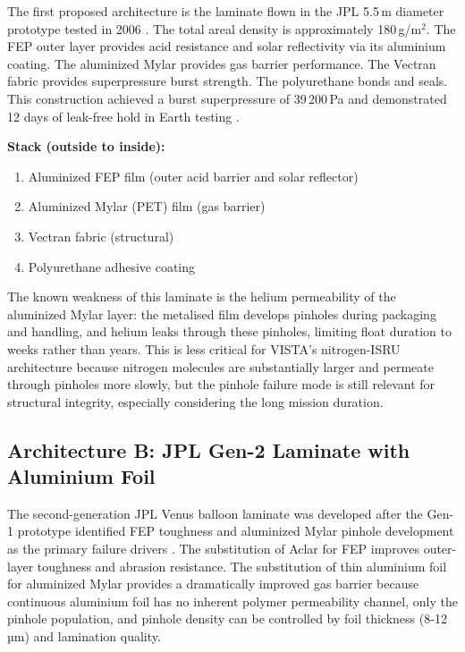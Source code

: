 \noindent The first proposed architecture is the laminate flown in the JPL 5.5\,m diameter prototype tested in 2006 \cite{Hall2007_VenusPrototype}. The total areal density is approximately 180\,g/m$^2$. The FEP outer layer provides acid resistance and solar reflectivity via its aluminium coating. The aluminized Mylar provides gas barrier performance. The Vectran fabric provides superpressure burst strength. The polyurethane bonds and seals. This construction achieved a burst superpressure of 39\,200\,Pa and demonstrated 12 days of leak-free hold in Earth testing \cite{Hall2007_VenusPrototype}.

\bigskip

\noindent \textbf{Stack (outside to inside):}
\begin{enumerate}[parsep=0pt]
\item Aluminized FEP film (outer acid barrier and solar reflector)
\item Aluminized Mylar (PET) film (gas barrier)
\item Vectran fabric (structural)
\item Polyurethane adhesive coating
\end{enumerate}

\medskip

\noindent The known weakness of this laminate is the helium permeability of the aluminized Mylar layer: the metalised film develops pinholes during packaging and handling, and helium leaks through these pinholes, limiting float duration to weeks rather than years. This is less critical for VISTA's nitrogen-ISRU architecture because nitrogen molecules are substantially larger and permeate through pinholes more slowly, but the pinhole failure mode is still relevant for structural integrity, especially considering the long mission duration.



\subsection{Architecture B: JPL Gen-2 Laminate with Aluminium Foil}
\label{ssec:arch-b}


\noindent The second-generation JPL Venus balloon laminate was developed after the Gen-1 prototype identified FEP toughness and aluminized Mylar pinhole development as the primary failure drivers \cite{Hall2011_TechDev}. The substitution of Aclar for FEP improves outer-layer toughness and abrasion resistance. The substitution of thin aluminium foil for aluminized Mylar provides a dramatically improved gas barrier because continuous aluminium foil has no inherent polymer permeability channel, only the pinhole population, and pinhole density can be controlled by foil thickness (8-12\,µm) and lamination quality. 

